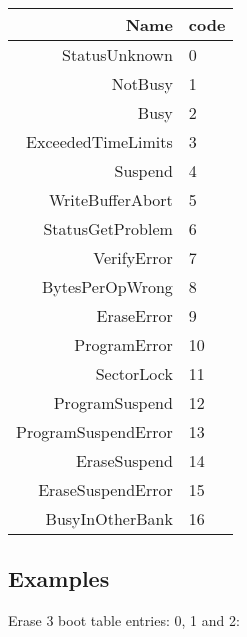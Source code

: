 \begin{tabular}{r | l}
    Name & code \\
    \hline
    StatusUnknown                                      & 0  \\
    NotBusy                                            & 1  \\
    Busy                                               & 2  \\
    ExceededTimeLimits                                 & 3  \\
    Suspend                                            & 4  \\
    WriteBufferAbort                                   & 5  \\
    StatusGetProblem                                   & 6  \\
    VerifyError                                        & 7  \\
    BytesPerOpWrong                                    & 8  \\
    EraseError                                         & 9  \\
    ProgramError                                       & 10 \\
    SectorLock                                         & 11 \\
    ProgramSuspend                                     & 12 \\
    ProgramSuspendError                                & 13 \\
    EraseSuspend                                       & 14 \\
    EraseSuspendError                                  & 15 \\
    BusyInOtherBank                                    & 16 \\
\end{tabular}

\subsection{Examples}
Erase 3 boot table entries: 0, 1 and 2:

